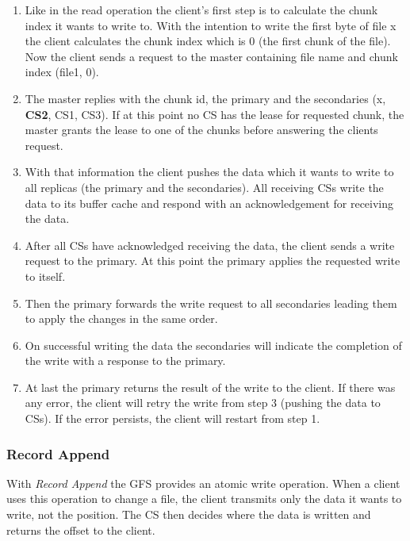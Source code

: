 \documentclass{sig-alternate}
\begin{document}
\begin{enumerate}
\item 
Like in the read operation the client's first step is to calculate the chunk index it wants to write to. With the intention to write the first byte of file x the client calculates the chunk index which is 0 (the first chunk of the file). Now the client sends a request to the master containing file name and chunk index (file1, 0).

\item
The master replies with the chunk id, the primary and the secondaries (x, \textbf{CS2}, CS1, CS3). If at this point no CS has the lease for requested chunk, the master grants the lease to one of the chunks before answering the clients request.

\item
With that information the client pushes the data which it wants to write to all replicas (the primary and the secondaries). All receiving CSs write the data to its buffer cache and respond with an acknowledgement for receiving the data.

\item
After all CSs have acknowledged receiving the data, the client sends a write request to the primary. At this point the primary applies the requested write to itself.

\item
Then the primary forwards the write request to all secondaries leading them to apply the changes in the same order.

\item
On successful writing the data the secondaries will indicate the completion of the write with a response to the primary.

\item
At last the primary returns the result of the write to the client. If there was any error, the client will retry the write from step 3 (pushing the data to CSs). If the error persists, the client will restart from step 1.

\end{enumerate}

\subsubsection{Record Append}
With \textit{Record Append} the GFS provides an atomic write operation. When a client uses this operation to change a file, the client transmits only the data it wants to write, not the position. The CS then decides where the data is written and returns the offset to the client.
\end{document}
